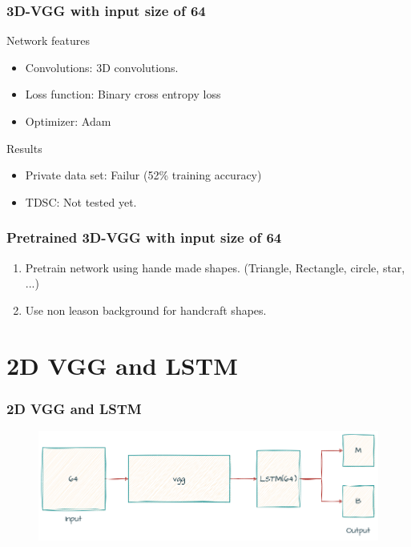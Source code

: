 \documentclass{beamer}
\begin{document}
\begin{frame}
	\frametitle{3D-VGG with input size of 64}
	\begin{block}{Network features}
		\begin{itemize}
			\item Convolutions: 3D convolutions.
			\item Loss function: Binary cross entropy loss
			\item Optimizer: Adam
		\end{itemize}
	\end{block}
	
	\begin{block}{Results}
		\begin{itemize}
			\item Private data set: Failur (52\% training accuracy)
			\item TDSC: Not tested yet.
		\end{itemize}
	\end{block}
\end{frame}

\begin{frame}
	\frametitle{Pretrained 3D-VGG with input size of 64}
	\begin{enumerate}
		\item Pretrain network using hande made shapes. (Triangle, Rectangle, circle, star, ...)
		\item Use non leason background for handcraft shapes.
	\end{enumerate}
\end{frame}

\section{2D VGG and LSTM}
\begin{frame}
	\frametitle{2D VGG and LSTM}
	\begin{center}
		\begin{figure}
			\includegraphics[scale=0.3]{vgg-lstm.png}
			\centering
		\end{figure}
	\end{center}
\end{frame}
\end{document}
